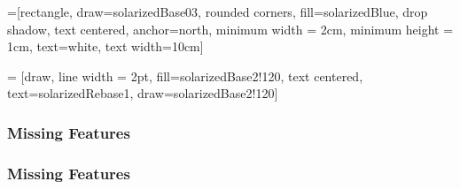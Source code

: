 
=[rectangle, draw=solarizedBase03, rounded corners, fill=solarizedBlue, drop shadow,
text centered, anchor=north, minimum width = 2cm, minimum height = 1cm, text=white, text width=10cm]

 = [draw, line width = 2pt, fill=solarizedBase2!120, text centered, text=solarizedRebase1, draw=solarizedBase2!120]


\begin{frame}
  \frametitle{Missing Features}
  \framesubtitle{\mbox{}}

 \begin{figure}[!htb]
    \centering
    \begin{minipage}{0.5\textwidth}
        \centering
          
    \end{minipage}%
    \begin{minipage}{0.5\textwidth}
        \centering
        
    \end{minipage}
\end{figure}

\end{frame}

\begin{frame}
  \frametitle{Missing Features}
  \framesubtitle{\mbox{}}
    \vspace*{-.2in}
    \begin{center}
        {\fontsize{40}{40}\selectfont{Prior AVMs \\ lack provably \\ optimal methods!}}
    \end{center}
\end{frame}
